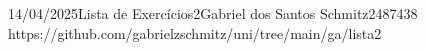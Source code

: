\documentclass{article}
\begin{document}
{14/04/2025}{Lista de Exercícios}{2}{Gabriel dos Santos Schmitz}{2487438}
{https://github.com/gabrielzschmitz/uni/tree/main/ga/lista2}





\newpage
\printbibliography\
\end{document}
